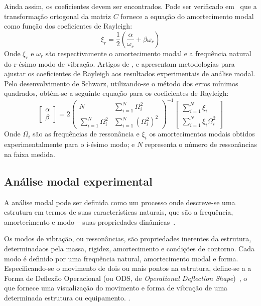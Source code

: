 Ainda assim, os coeficientes devem ser encontrados. Pode ser verificado
em~\cite{craig2006fundamentals} que a transformação ortogonal da matriz $C$
fornece a equação do amortecimento modal como função dos coeficientes
de Rayleigh:
%
\begin{equation} \label{eq::xir}
	\xi_r = \frac{1}{2}\left(\frac{\alpha}{\omega_r} + \beta \omega_r\right )
\end{equation}
%
Onde $\xi_r$ e $\omega_r$ são respectivamente o amortecimento modal e a
frequência natural do r-ésimo modo de vibração. Artigos de
\citet{chen1996estimation}, \citet{adhikari2004rayleigh} e
\citet{schwarz2013proportional} apresentam metodologias para ajustar os
coeficientes de Rayleigh aos resultados experimentais de análise modal. Pelo
desenvolvimento de Schwarz, utilizando-se o método dos erros mínimos quadrados,
obtém-se a seguinte equação para os coeficientes de Rayleigh:
%
\begin{equation} \label{eq::brian}
	\begin{bmatrix}
	\alpha \\
	\beta
	\end{bmatrix}
= 2
	\begin{pmatrix}
	N & {\sum\limits_{i=1}^{N}\Omega_i^{2}} \\ 
	{\sum\limits_{i=1}^{N}\Omega_i^{2}} &
	{\sum\limits_{i=1}^{N}\left(\Omega_i^{2}\right)^2}
	\end{pmatrix}^{-1}
	\begin{bmatrix}
	\sum\limits_{i=1}^{N}\xi_i \\ 
	\sum\limits_{i=1}^{N}\xi_i \Omega_i^2
	\end{bmatrix}
\end{equation}
%
Onde $\Omega_i$ são as frequências de ressonância e $\xi_i$ os amortecimentos
modais obtidos experimentalmente para o i-ésimo modo; e $N$ representa o número
de ressonâncias na faixa medida.

\subsection{Análise modal experimental} \label{sec::modal_analysis}

A análise modal pode ser definida como um processo onde descreve-se uma
estrutura em termos de suas características naturais, que são a frequência,
amortecimento e modo -- suas propriedades
dinâmicas~\cite{avitabile2001experimental}.

Os modos de vibração, ou ressonâncias, são propriedades inerentes da estrutura,
determinadaos pela massa, rigidez, amortecimento e condições de contorno. Cada
modo é definido por uma frequência natural, amortecimento modal e forma.
Especificando-se o movimento de dois ou mais pontos na estrutura, define-se a a
Forma de Deflexão Operacional (ou ODS, de \textit{Operational Deflection
Shape})~\cite{schwarz1999experimental}, o que fornece uma visualização do
movimento e forma de vibração de uma determinada estrutura ou equipamento.
.

